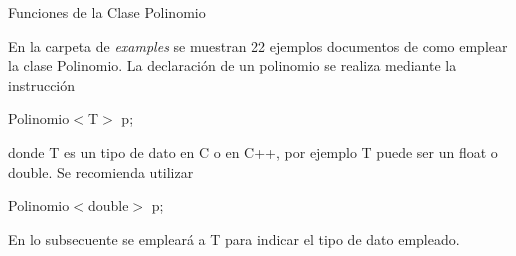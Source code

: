 \documentclass[a4paper,11pt]{article}
\begin{document}
\newpage
\vspace{3mm}
\noindent
\begin{center}
\begin{Large}
Funciones de la Clase Polinomio
\end{Large}
\end{center}
En la carpeta de \textit{examples} se muestran 22 ejemplos documentos de como emplear
la clase Polinomio. La declaraci\'on de un polinomio se realiza mediante la instrucci\'on
\begin{center}
 Polinomio$<$T$>$ p;
\end{center}
donde T es un tipo de dato en C o en C++, por ejemplo T puede ser un float o double.
Se recomienda utilizar
\begin{center}
 Polinomio$<$double$>$ p;
\end{center}
En lo subsecuente se emplear\'a a T para indicar el tipo de dato empleado.
\end{document}
